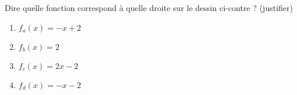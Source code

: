 
\begin{exercice}\label{exosmath-0679}

\let\Oldtheenumi\theenumi
\renewcommand{\theenumi}{(\alph{enumi})}

\begin{multicols}{2}

Dire quelle fonction correspond à quelle droite sur le dessin ci-contre ? (justifier)
\begin{enumerate}
    \item
        \( f_a(x)=-x+2\)
    \item
        \( f_b(x)=2\)
    \item
        \( f_c(x)=2x-2\)
    \item
        \( f_d(x)=-x-2\)
\end{enumerate}

\let\theenumi\Oldtheenumi

\columnbreak

\begin{center}
   
\end{center}

\end{multicols}
\end{exercice}
